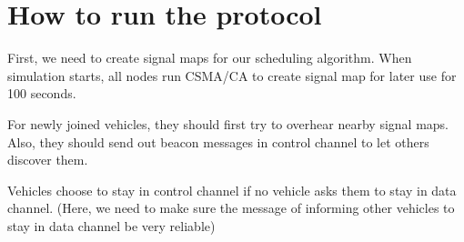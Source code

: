 \documentclass[10pt]{article}
\begin{document}
\section{How to run the protocol}
First, we need to create signal maps for our scheduling algorithm. When simulation starts, all nodes run CSMA/CA to create signal map for later use for 100 seconds.

For newly joined vehicles, they should first try to overhear nearby signal maps. Also, they should send out beacon messages in control channel to let others discover them.

Vehicles choose to stay in control channel if no vehicle asks them to stay in data channel. (Here, we need to make sure the message of informing other vehicles to stay in data channel be very reliable) 
\end{document}
